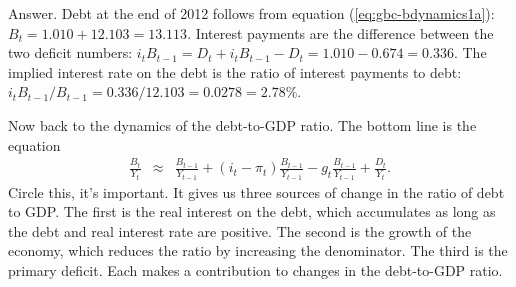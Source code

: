 Answer.
Debt at the end of 2012 follows from equation (\ref{eq:gbc-bdynamics1a}):
$B_t = 1.010 + 12.103 = 13.113$.
Interest payments are the difference between the two deficit numbers:
$ i_t B_{t-1} = D_t + i_t B_{t-1} - D_t = 1.010 - 0.674 = 0.336 $.
The implied interest rate on the debt is
the ratio of interest payments to debt:
$ i_t B_{t-1}/B_{t-1} = 0.336/12.103 = 0.0278 = 2.78\%$.


Now back to the dynamics of the debt-to-GDP ratio.
The bottom line is the equation
\begin{eqnarray}
    \frac{B_{t}}{Y_{t}}
            &\approx&
                \frac{B_{t-1}}{Y_{t-1}} + (i_t-\pi_t) \frac{B_{t-1}}{Y_{t-1}}
                - g_t \frac{B_{t-1}}{Y_{t-1}}
             +    \frac{D_{t}}{Y_{t}}  .
    \label{eq:debtdynamics}
\end{eqnarray}
Circle this, it's important.
It gives us three sources
of change in the ratio of debt to GDP.
The first is the real interest on the debt, which accumulates
as long as the debt and real interest rate are positive.
The second is the growth of the economy,
which reduces the ratio by increasing the denominator.
The third is the primary deficit.
Each makes a contribution to changes in the debt-to-GDP ratio.


